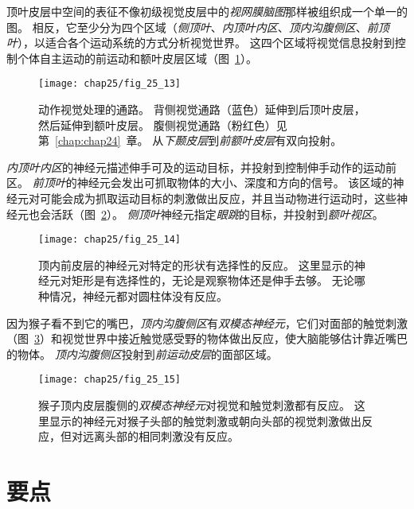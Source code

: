 顶叶皮层中空间的表征不像初级视觉皮层中的\textit{视网膜脑图}那样被组织成一个单一的图。
相反，它至少分为四个区域（\textit{侧顶叶}、\textit{内顶叶内区}、\textit{顶内沟腹侧区}、\textit{前顶叶}），以适合各个运动系统的方式分析视觉世界。
这四个区域将视觉信息投射到控制个体自主运动的前运动和额叶皮层区域（图~\ref{fig:25_13}）。


\begin{figure}[htbp]
	\centering
	\texttt{[image: chap25/fig\_25\_13]}
	\caption{动作视觉处理的通路。
		背侧视觉通路（蓝色）延伸到后顶叶皮层，然后延伸到额叶皮层。
		腹侧视觉通路（粉红色）见第~\ref{chap:chap24}~章。
		从\textit{下颞皮层}到\textit{前额叶皮层}有双向投射。}
	\label{fig:25_13}
\end{figure}


\textit{内顶叶内区}的神经元描述伸手可及的运动目标，并投射到控制伸手动作的运动前区。
\textit{前顶叶}的神经元会发出可抓取物体的大小、深度和方向的信号。
该区域的神经元对可能会成为抓取运动目标的刺激做出反应，并且当动物进行运动时，这些神经元也会活跃（图~\ref{fig:25_14}）。
\textit{侧顶叶}神经元指定\textit{眼跳}的目标，并投射到\textit{额叶视区}。


\begin{figure}[htbp]
	\centering
	\texttt{[image: chap25/fig\_25\_14]}
	\caption{顶内前皮层的神经元对特定的形状有选择性的反应。
		这里显示的神经元对矩形是有选择性的，无论是观察物体还是伸手去够。
		无论哪种情况，神经元都对圆柱体没有反应。}
	\label{fig:25_14}
\end{figure}


因为猴子看不到它的嘴巴，\textit{顶内沟腹侧区}有\textit{双模态神经元}，它们对面部的触觉刺激（图~\ref{fig:25_15}）和视觉世界中接近触觉感受野的物体做出反应，使大脑能够估计靠近嘴巴的物体。
\textit{顶内沟腹侧区}投射到\textit{前运动皮层}的面部区域。


\begin{figure}[htbp]
	\centering
	\texttt{[image: chap25/fig\_25\_15]}
	\caption{猴子顶内皮层腹侧的\textit{双模态神经元}对视觉和触觉刺激都有反应。
		这里显示的神经元对猴子头部的触觉刺激或朝向头部的视觉刺激做出反应，但对远离头部的相同刺激没有反应。}
	\label{fig:25_15}
\end{figure}



\section{要点}

